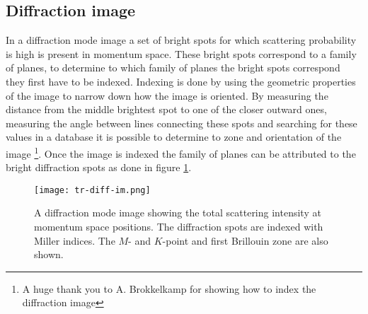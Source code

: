 \subsection{Diffraction image}
In a diffraction mode image a set of bright spots for which scattering probability is high is present in momentum space. These bright spots correspond to a family of planes, to determine to which family of planes the bright spots correspond they first have to be indexed. Indexing is done by using the geometric properties of the image to narrow down how the image is oriented.
By measuring the distance from the middle brightest spot to one of the closer outward ones, measuring the angle between lines connecting these spots and searching for these values in a database it is possible to determine to zone and orientation of the image \footnote{A huge thank you to A. Brokkelkamp for showing how to index the diffraction image}. Once the image is indexed the family of planes can be attributed to the bright diffraction spots as done in figure \ref{fig:tr-diff-im}.

\begin{figure}[H]
	\centering
	\texttt{[image: tr-diff-im.png]}
	\caption{A diffraction mode image showing the total scattering intensity at momentum space positions. The diffraction spots are indexed with Miller indices. The $M$- and $K$-point and first Brillouin zone are also shown.}
	\label{fig:tr-diff-im}
\end{figure}
%
